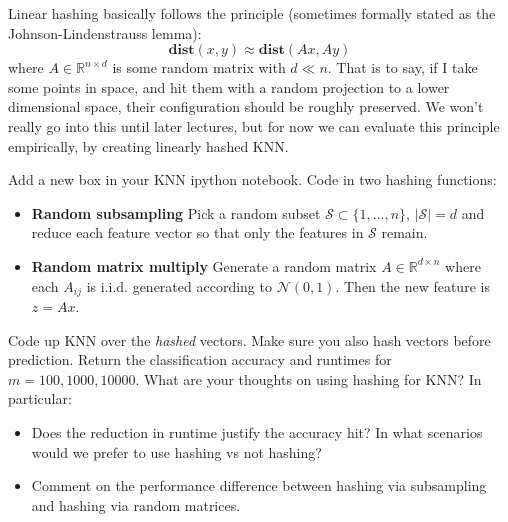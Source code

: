 \documentclass{article}
\newcommand{\R}{\mathbb R}
\newcommand{\mN}{\mathcal N}
\newcommand{\mS}{\mathcal S}
\begin{document}
\begin{enumerate}
 Linear hashing basically follows the principle (sometimes formally stated as the Johnson-Lindenstrauss lemma):
\[
\mathbf{dist}(x,y) \approx \mathbf{dist}(Ax,Ay)
\] 
where $A\in \R^{n\times d}$ is some random matrix with $d \ll n$. That is to say, if I take some points in space, and hit them with a random projection to a lower dimensional space, their configuration should be roughly preserved. We won't really go into this until later lectures, but for now we can evaluate this principle empirically, by creating linearly hashed KNN.
 
 
Add a new box in your KNN ipython notebook. Code in two hashing functions:



\begin{itemize}
\item \textbf{Random subsampling} Pick a random subset $\mS\subset \{1,...,n\}$, $|\mS| = d$ and reduce each feature vector so that only the features in $\mS$ remain. 

\item \textbf{Random matrix multiply} Generate a random matrix $A\in \R^{d\times n}$ where each $A_{ij}$ is i.i.d. generated according to $\mN(0,1)$. Then the new feature is $z = Ax$.
\end{itemize}

Code up KNN over the \emph{hashed} vectors. Make sure you also hash vectors before prediction. 
Return the classification accuracy and runtimes for $m = 100,1000,10000$. 
What are your thoughts on using hashing for KNN? In particular:
\begin{itemize}
\item Does the reduction in runtime justify the accuracy hit? In what scenarios would we prefer to use hashing vs not hashing?


\item Comment on the performance difference between hashing via subsampling and hashing via random matrices.

\end{itemize}
\end{enumerate}
\end{document}
